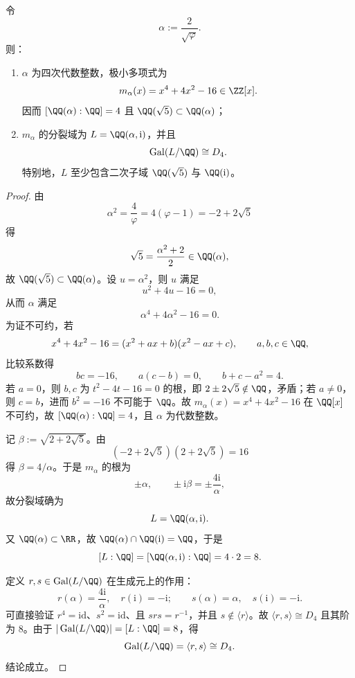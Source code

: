 \begin{theorem}\label{thm:near1-alpha-2-over-sqrtphi-galois-D4}
令
\[
\alpha:=\frac{2}{\sqrt\varphi}.
\]
则：
\begin{enumerate}
  \item \(\alpha\) 为四次代数整数，极小多项式为
  \[
  m_\alpha(x)=x^4+4x^2-16\in\ZZ[x].
  \]
  因而
  \(
  [\QQ(\alpha):\QQ]=4
  \)
  且
  \(
  \QQ(\sqrt5)\subset\QQ(\alpha)
  \)；
  \item \(m_\alpha\) 的分裂域为 \(L=\QQ(\alpha,\mathrm{i})\)，并且
  \[
  \operatorname{Gal}(L/\QQ)\cong D_4.
  \]
  特别地，\(L\) 至少包含二次子域 \(\QQ(\sqrt5)\) 与 \(\QQ(\mathrm{i})\)。
\end{enumerate}
\end{theorem}
\begin{proof}
由
\[
\alpha^2=\frac{4}{\varphi}=4(\varphi-1)=-2+2\sqrt5
\]
得
\[
\sqrt5=\frac{\alpha^2+2}{2}\in\QQ(\alpha),
\]
故 \(\QQ(\sqrt5)\subset\QQ(\alpha)\)。设 \(u=\alpha^2\)，则 \(u\) 满足
\[
u^2+4u-16=0,
\]
从而 \(\alpha\) 满足
\[
\alpha^4+4\alpha^2-16=0.
\]
为证不可约，若
\[
x^4+4x^2-16=(x^2+ax+b)(x^2-ax+c),\qquad a,b,c\in\QQ,
\]
比较系数得
\[
bc=-16,\qquad a(c-b)=0,\qquad b+c-a^2=4.
\]
若 \(a=0\)，则 \(b,c\) 为 \(t^2-4t-16=0\) 的根，即 \(2\pm 2\sqrt5\notin\QQ\)，矛盾；若 \(a\neq 0\)，则 \(c=b\)，进而 \(b^2=-16\) 不可能于 \(\QQ\)。故 \(m_\alpha(x)=x^4+4x^2-16\) 在 \(\QQ[x]\) 不可约，故 \([\QQ(\alpha):\QQ]=4\)，且 \(\alpha\) 为代数整数。

记 \(\beta:=\sqrt{2+2\sqrt5}\)。由
\[
(-2+2\sqrt5)(2+2\sqrt5)=16
\]
得 \(\beta=4/\alpha\)。于是 \(m_\alpha\) 的根为
\[
\pm\alpha,\qquad \pm \mathrm{i}\beta=\pm\frac{4\mathrm{i}}{\alpha},
\]
故分裂域确为
\[
L=\QQ(\alpha,\mathrm{i}).
\]
又 \(\QQ(\alpha)\subset\RR\)，故 \(\QQ(\alpha)\cap\QQ(\mathrm{i})=\QQ\)，于是
\[
[L:\QQ]=[\QQ(\alpha,\mathrm{i}):\QQ]=4\cdot 2=8.
\]

定义 \(r,s\in\operatorname{Gal}(L/\QQ)\) 在生成元上的作用：
\[
r(\alpha)=\frac{4\mathrm{i}}{\alpha},\quad r(\mathrm{i})=-\mathrm{i};
\qquad
s(\alpha)=\alpha,\quad s(\mathrm{i})=-\mathrm{i}.
\]
可直接验证 \(r^4=\mathrm{id}\)、\(s^2=\mathrm{id}\)、且 \(srs=r^{-1}\)，并且 \(s\notin\langle r\rangle\)。故 \(\langle r,s\rangle\cong D_4\) 且其阶为 \(8\)。由于 \(|\operatorname{Gal}(L/\QQ)|=[L:\QQ]=8\)，得
\[
\operatorname{Gal}(L/\QQ)=\langle r,s\rangle\cong D_4.
\]
结论成立。
\end{proof}

